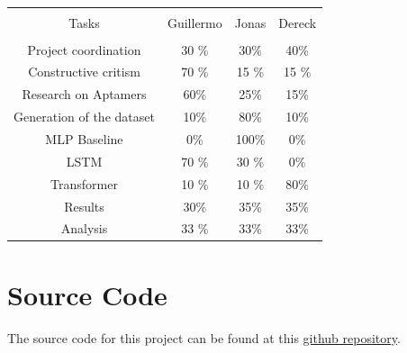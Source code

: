 \documentclass[11pt]{article}
\begin{document}
\begin{table}[H]
    \centering
    \caption{}
    \begin{tabular}{|c|c|c|c|}
    \hline \\
    Tasks & Guillermo & Jonas & Dereck \\
    \hline \\
     Project coordination & 30 \% & 30\% & 40\% \\
     Constructive critism & 70 \% & 15 \% & 15 \% \\
     Research on Aptamers & 60\% & 25\% & 15\% \\
     Generation of the dataset & 10\% & 80\% & 10\% \\
     MLP Baseline & 0\% & 100\% & 0\% \\
     LSTM & 70 \% & 30 \% & 0\% \\
     Transformer & 10 \% & 10 \% & 80\% \\
     Results & 30\% & 35\% & 35\% \\
     Analysis & 33 \% & 33\% & 33\% \\
     \hline
    \end{tabular}
     \label{tab:contrib} 
\end{table}
\section{Source Code}

The source code for this project can be found at this \href{https://github.com/ScierKnave/dna_aptamers_modelling}{github repository}.


\end{document}
